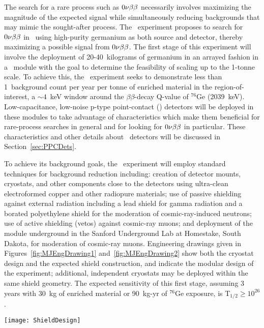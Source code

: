The search for a rare process such as $0 \nu \beta \beta$ necessarily involves maximizing the magnitude of the expected signal while
simultaneously reducing backgrounds that may mimic the sought-after process.  
The \MJ~experiment proposes to search for $0 \nu \beta \beta$ in \gersevensix~using high-purity
germanium as both source and detector, thereby maximizing a possible signal from $0 \nu \beta \beta$. 
The first stage of this experiment will involve the deployment of 20-40~kilograms of germanium in an arrayed fashion in a \minmod~module with the goal to determine
the feasibility of scaling up to the 1-tonne scale.  To achieve this, the \MJ~experiment seeks to demonstrate less than
1~background count per year per tonne of enriched material in the
region-of-interest, a $\sim4$~keV window around the $\beta\beta$-decay
Q-value of $^{76}$Ge (2039~keV).  Low-capacitance, low-noise p-type point-contact (\ppc)
detectors will be deployed in these modules to take advantage of characteristics which make 
them beneficial for rare-process searches in general and for looking for $0 \nu \beta \beta$ in particular.  These characteristics and other details about \ppc~detectors will be discussed in Section~\ref{sec:PPCDets}.  

To achieve its background goals, the \MJ~experiment will employ standard
techniques for background reduction including: creation of detector mounts,
cryostats, and other components close to the detectors using ultra-clean
electroformed copper and other radiopure materials; use of passive shielding
against external radiation including a lead shield for gamma radiation and a
borated polyethylene shield for the moderation of cosmic-ray-induced neutrons;
use of active shielding (vetos) against cosmic-ray muons; and deployment of the
module underground in the Sanford Underground Lab at Homestake, South Dakota,
for moderation of cosmic-ray muons.  Engineering drawings given in
Figures~\ref{fig:MJEngDrawing1} and~\ref{fig:MJEngDrawing2} show both the
cryostat design and the expected shield construction, and indicate the modular
design of the experiment; additional, independent cryostats may be deployed
within the same shield geometry.  
The expected sensitivity of this first stage, 
assuming 3 years with 30~kg of enriched material or 90~kg-yr of $^{76}$Ge
exposure, is T$_{1/2}\geq 10^{26}$.  

	
		\begin{sidewaysfigure}
			\centering		
			\def\figheight{0.45\textheight}
			\texttt{[image: ShieldDesign]}
			\caption[\MJ~\minmod~shield geometry]{\MJ~\minmod~shield geometry.  The modular design of the shield will 
			enable a phased deployment of cryostats, allowing sets of detectors to be easily added after initial commissioning of the 
			experiment.  From the \MJ~collaboration~\cite{MJCollaboration}.}
			\label{fig:MJEngDrawing2}
		\end{sidewaysfigure}
	
